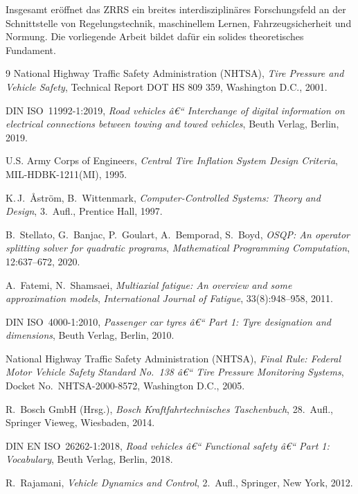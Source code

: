 ﻿\documentclass[a4paper,12pt]{article}
\theoremstyle{definition}
\begin{document}
Insgesamt eröffnet das ZRRS ein breites interdisziplinäres Forschungsfeld
an der Schnittstelle von Regelungstechnik, maschinellem Lernen,
Fahrzeugsicherheit und Normung. Die vorliegende Arbeit bildet dafür
ein solides theoretisches Fundament.


\begin{thebibliography}{9}
National Highway Traffic Safety Administration (NHTSA),
\textit{Tire Pressure and Vehicle Safety}, Technical Report DOT HS 809 359,
Washington D.C., 2001.

DIN ISO~11992-1:2019,
\textit{Road vehicles â€“ Interchange of digital information on electrical connections between towing and towed vehicles},
Beuth Verlag, Berlin, 2019.

U.S. Army Corps of Engineers,
\textit{Central Tire Inflation System Design Criteria}, MIL-HDBK-1211(MI),
1995.

K.\,J.~\AA{}str\"{o}m, B.~Wittenmark,
\textit{Computer-Controlled Systems: Theory and Design},
3.~Aufl., Prentice Hall, 1997.

B.~Stellato, G.~Banjac, P.~Goulart, A.~Bemporad, S.~Boyd,
\textit{OSQP: An operator splitting solver for quadratic programs},
\textit{Mathematical Programming Computation}, 12:637--672, 2020.

A.~Fatemi, N.~Shamsaei,
\textit{Multiaxial fatigue: An overview and some approximation models},
\textit{International Journal of Fatigue}, 33(8):948--958, 2011.

DIN ISO~4000-1:2010,
\textit{Passenger car tyres â€“ Part 1: Tyre designation and dimensions},
Beuth Verlag, Berlin, 2010.

National Highway Traffic Safety Administration (NHTSA),
\textit{Final Rule: Federal Motor Vehicle Safety Standard No.~138 â€“ Tire Pressure Monitoring Systems},
Docket No.~NHTSA-2000-8572, Washington D.C., 2005.

R.~Bosch GmbH (Hrsg.),
\textit{Bosch Kraftfahrtechnisches Taschenbuch},
28.~Aufl., Springer Vieweg, Wiesbaden, 2014.

DIN EN ISO~26262-1:2018,
\textit{Road vehicles â€“ Functional safety â€“ Part 1: Vocabulary},
Beuth Verlag, Berlin, 2018.

R.~Rajamani,
\textit{Vehicle Dynamics and Control},
2.~Aufl., Springer, New York, 2012.


\end{thebibliography}
\end{document}
